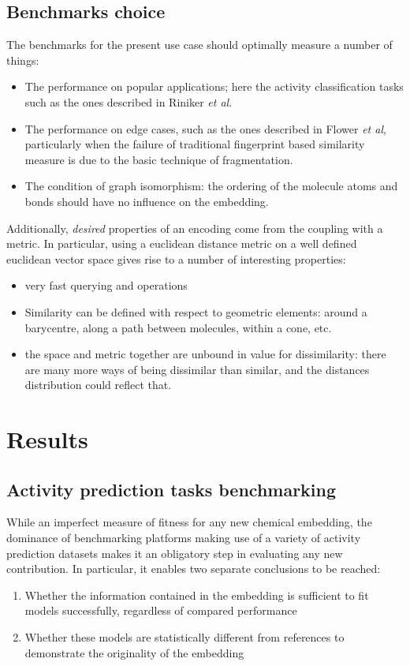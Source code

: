\documentclass[doublespacing]{bmcart}
\begin{document}
\subsection*{Benchmarks choice}
The benchmarks for the present use case should optimally measure a number of things:
\begin{itemize}
\item The performance on popular applications; here the activity classification tasks such as the ones described in Riniker \textit{et al}\cite{riniker2013open}.
\item The performance on edge cases, such as the ones described in Flower \textit{et al}\cite{flower1998properties}, particularly when the failure of traditional fingerprint based similarity measure is due to the basic technique of fragmentation.
\item The condition of graph isomorphism: the ordering of the molecule atoms and bonds should have no influence on the embedding.
\end{itemize}
Additionally, \textit{desired} properties of an encoding come from the coupling with a metric. In particular, using a euclidean distance metric on a well defined euclidean vector space gives rise to a number of interesting properties:
\begin{itemize}
\item very fast querying and operations
\item Similarity can be defined with respect to geometric elements: around a barycentre, along a path between molecules, within a cone, etc.
\item the space and metric together are unbound in value for dissimilarity: there are many more ways of being dissimilar than similar, and the distances distribution could reflect that.
\end{itemize}
\section*{Results}
\subsection*{Activity prediction tasks benchmarking}
While an imperfect measure of fitness for any new chemical embedding, the dominance of benchmarking platforms making use of a variety of activity prediction datasets makes it an obligatory step in evaluating any new contribution. In particular, it enables two separate conclusions to be reached:
\begin{enumerate}
\item Whether the information contained in the embedding is sufficient to fit models successfully, regardless of compared performance
\item Whether these models are statistically different from references to demonstrate the originality of the embedding
\end{enumerate}
\end{document}
